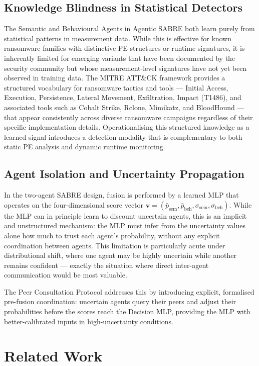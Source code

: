 \subsection{Knowledge Blindness in Statistical Detectors}

The Semantic and Behavioural Agents in Agentic SABRE both learn purely from statistical patterns in measurement data. While this is effective for known ransomware families with distinctive PE structures or runtime signatures, it is inherently limited for emerging variants that have been documented by the security community but whose measurement-level signatures have not yet been observed in training data. The MITRE ATT\&CK framework provides a structured vocabulary for ransomware tactics and tools — Initial Access, Execution, Persistence, Lateral Movement, Exfiltration, Impact (T1486), and associated tools such as Cobalt Strike, Rclone, Mimikatz, and BloodHound — that appear consistently across diverse ransomware campaigns regardless of their specific implementation details. Operationalising this structured knowledge as a learned signal introduces a detection modality that is complementary to both static PE analysis and dynamic runtime monitoring.

\subsection{Agent Isolation and Uncertainty Propagation}

In the two-agent SABRE design, fusion is performed by a learned MLP that operates on the four-dimensional score vector $\mathbf{v} = (\bar{p}_\text{sem}, \bar{p}_\text{beh}, \sigma_\text{sem}, \sigma_\text{beh})$. While the MLP can in principle learn to discount uncertain agents, this is an implicit and unstructured mechanism: the MLP must infer from the uncertainty values alone how much to trust each agent's probability, without any explicit coordination between agents. This limitation is particularly acute under distributional shift, where one agent may be highly uncertain while another remains confident — exactly the situation where direct inter-agent communication would be most valuable.

The Peer Consultation Protocol addresses this by introducing explicit, formalised pre-fusion coordination: uncertain agents query their peers and adjust their probabilities before the scores reach the Decision MLP, providing the MLP with better-calibrated inputs in high-uncertainty conditions.


\section{Related Work}
\label{sec:tifs_related}

